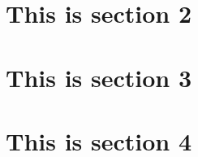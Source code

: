 \documentclass[12pt, a4paper, ngerman, bidi=default]{article}
\begin{document}
\section{This is section 2}


\section{This is section 3}

\section{This is section 4}

\newpage{}
\printbibliography[
heading=bibintoc,
title={References} %
]
\end{document}
